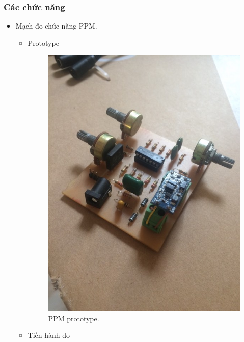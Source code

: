 \documentclass[a4paper,12pt,oneside]{article}
\begin{document}
\subsubsection{Các chức năng}
\begin{itemize}
	\item Mạch đo chức năng PPM.
		\begin{itemize}
\item Prototype
	\begin{figure}[H]
	\begin{center}
	\includegraphics[scale=.6]{hinh/PPM/prototype_ppm.jpg}
	\end{center}
	\caption{PPM prototype.}
	\end{figure}
\item Tiến hành đo
	\begin{figure}[H]
	\begin{center}

\end{center}
\end{figure}
\end{itemize}
\end{itemize}
\end{document}
